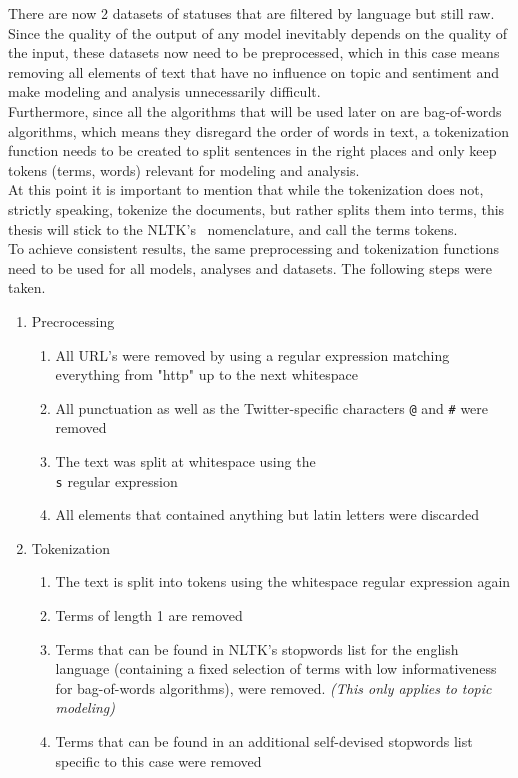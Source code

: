 There are now 2 datasets of statuses that are filtered by language but still raw.
Since the quality of the output of any model inevitably depends on the quality of the input,
these datasets now need to be preprocessed,
which in this case means removing all elements of text that have no influence on topic and sentiment and make
modeling and analysis unnecessarily difficult.\\
Furthermore, since all the algorithms that will be used later on are bag-of-words algorithms,
which means they disregard the order of words in text, a tokenization function needs to be created
to split sentences in the right places and only keep tokens (terms, words) relevant for modeling and analysis.
\\
At this point it is important to mention that while the tokenization does not, strictly speaking, tokenize the documents,
but rather splits them into terms, this thesis will stick to the NLTK's~\cite{nltkDocs} nomenclature, and call the terms tokens.
\\
To achieve consistent results, the same preprocessing and tokenization functions need to be used for all models, analyses and datasets.
The following steps were taken.

\begin{enumerate}
    \item Precrocessing
    \begin{enumerate}
        \item All URL's were removed by using a regular expression matching everything from "http" up to the next whitespace
        \item All punctuation as well as the Twitter-specific characters \texttt{@} and \texttt{\#} were removed
        \item The text was split at whitespace using the \texttt{\\s} regular expression
        \item All elements that contained anything but latin letters were discarded
    \end{enumerate}
    \item Tokenization
    \begin{enumerate}
        \item The text is split into tokens using the whitespace regular expression again
        \item Terms of length 1 are removed
        \item Terms that can be found in NLTK's stopwords list for the english language
        (containing a fixed selection of terms with low informativeness for bag-of-words algorithms),
        were removed. \textit{(This only applies to topic modeling)}
        \item Terms that can be found in an additional self-devised stopwords list specific to this case were removed
    \end{enumerate}
\end{enumerate}

